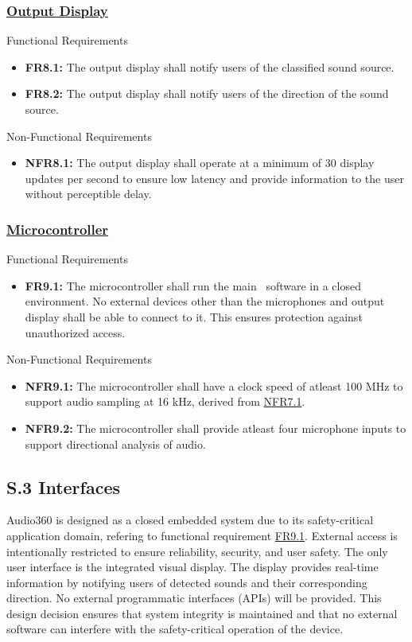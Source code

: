 \documentclass[12pt]{article}
\theoremstyle{definition}
\begin{document}
\subsubsection{\hyperref[comp:display]{Output Display}} Functional Requirements
\begin{itemize}
  \item \label{FR8_1}\textbf{FR8.1:} The output display shall notify users of
  the classified sound source.

  \item \label{FR8_2}\textbf{FR8.2:} The output display shall notify users of
  the direction of the sound source.
\end{itemize}

Non-Functional Requirements
\begin{itemize}
  \item \label{NFR8_1}\textbf{NFR8.1:} The output display shall operate at a
  minimum of 30 display updates per second to ensure low latency and provide
  information to the user without perceptible delay.
\end{itemize}

\subsubsection{\hyperref[comp:microcontroller]{Microcontroller}} Functional
Requirements
\begin{itemize}
  \item \label{FR9_1}\textbf{FR9.1:} The microcontroller shall run the main
  \progname ~software in a closed environment. No external devices other than
  the microphones and output display shall be able to connect to it. This
  ensures protection against unauthorized access.
\end{itemize}

Non-Functional Requirements
\begin{itemize}
  \item \label{NFR9_1}\textbf{NFR9.1:} The microcontroller shall have a clock
  speed of atleast 100 MHz to support audio sampling at 16 kHz, derived from
  \hyperref[NFR7_1]{NFR7.1}.

  \item \label{FR9_2}\textbf{NFR9.2:} The microcontroller shall provide atleast
  four microphone inputs to support directional analysis of audio.
\end{itemize}


\subsection{S.3 Interfaces}
Audio360 is designed as a closed embedded system due to its safety-critical
application domain, refering to functional requirement \hyperref[FR9_1]{FR9.1}.
External access is intentionally restricted to ensure reliability, security, and
user safety. The only user interface is the integrated visual display. The
display provides real-time information by notifying users of detected sounds and
their corresponding direction. No external programmatic interfaces (APIs) will
be provided. This design decision ensures that system integrity is maintained
and that no external software can interfere with the safety-critical operation
of the device.
\end{document}
